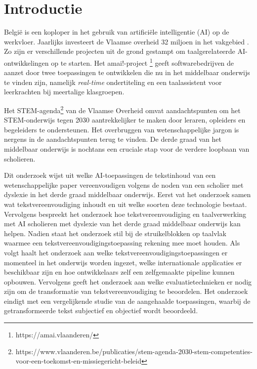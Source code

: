 
\section{Introductie}%
\label{sec:introductie}

België is een koploper in het gebruik van artificiële intelligentie (AI) op de werkvloer. Jaarlijks investeert de Vlaamse overheid 32 miljoen in het vakgebied \autocite{Crevits2022}. Zo zijn er verschillende projecten uit de grond gestampt om taalgerelateerde AI-ontwikkelingen op te starten. Het amai!-project \footnote{https://amai.vlaanderen/} geeft softwarebedrijven de aanzet door twee toepassingen te ontwikkelen die nu in het middelbaar onderwijs te vinden zijn, namelijk \textit{real-time} ondertiteling en een taalassistent voor leerkrachten bij meertalige klasgroepen.

Het STEM-agenda\footnote{https://www.vlaanderen.be/publicaties/stem-agenda-2030-stem-competenties-voor-een-toekomst-en-missiegericht-beleid}
van de Vlaamse Overheid omvat aandachtspunten om het STEM-onderwijs tegen 2030 aantrekkelijker te maken door leraren, opleiders en begeleiders te ondersteunen. Het overbruggen van wetenschappelijke jargon is nergens in de aandachtspunten terug te vinden. De derde graad van het middelbaar onderwijs is nochtans een cruciale stap voor de verdere loopbaan van scholieren. 

Dit onderzoek wijst uit welke AI-toepassingen de tekstinhoud van een wetenschappelijke paper vereenvoudigen volgens de noden van een scholier met dyslexie in het derde graad middelbaar onderwijs. Eerst vat het onderzoek samen wat tekstvereenvoudiging inhoudt en uit welke soorten deze technologie bestaat. Vervolgens bespreekt het onderzoek hoe tekstvereenvoudiging en taalverwerking met AI scholieren met dyslexie van het derde graad middelbaar onderwijs kan helpen. Nadien staat het onderzoek stil bij de struikelblokken op taalvlak waarmee een tekstvereenvoudigingstoepassing rekening mee moet houden. Als volgt haalt het onderzoek aan welke tekstvereenvoudigingstoepassingen er momenteel in het onderwijs worden ingezet, welke internationale applicaties er beschikbaar zijn en hoe ontwikkelaars zelf een zelfgemaakte pipeline kunnen opbouwen. Vervolgens geeft het onderzoek aan welke evaluatietechnieken er nodig zijn om de transformatie van tekstvereenvoudiging te beoordelen. Het onderzoek eindigt met een vergelijkende studie van de aangehaalde toepassingen, waarbij de getransformeerde tekst subjectief en objectief wordt beoordeeld.

